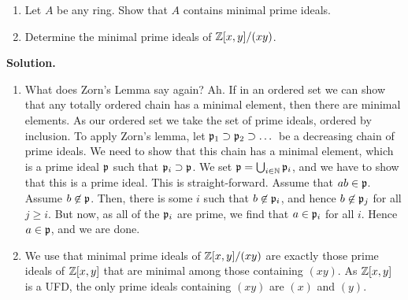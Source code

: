 \documentclass[a4paper,11pt]{article}
\begin{document}
\begin{enumerate}
    \item Let $A$ be any ring. Show that $A$ contains minimal prime ideals. 
    \item Determine the minimal prime ideals of $\mathbb{Z}[x,y]/(xy)$. 
\end{enumerate}

\textbf{Solution.}
\begin{enumerate}
    \item What does Zorn's Lemma say again? Ah. If in an ordered set we can
        show that any totally ordered chain has a minimal element, then there
        are minimal elements. As our ordered set we take the set of prime ideals,
        ordered by inclusion. To apply Zorn's lemma, let $\mathfrak{p}_1 \supset \mathfrak{p}_2
        \supset \dots$ be a decreasing chain of prime ideals. We need to show
        that this chain has a minimal element, which is a prime ideal 
        $\mathfrak{p}$ such that $\mathfrak{p}_i \supset \mathfrak{p}$. We set $\mathfrak{p} = \bigcup_{i \in \mathbb{N}}
        \mathfrak{p}_i$, and we have to show that this is a prime ideal. This is
        straight-forward. Assume that $ab \in \mathfrak{p}$. Assume $b \not \in \mathfrak{p}$.
        Then, there is some $i$ such that $b \not \in \mathfrak{p}_i$, and hence $b \not
        \in \mathfrak{p}_j$ for all $j \geq i$. But now, as all of the $\mathfrak{p}_i$ are
        prime, we find that $a \in \mathfrak{p}_i$ for all $i$. Hence $a \in \mathfrak{p}$, and
        we are done. 
    \item We use that minimal prime ideals of $\mathbb{Z}[x,y]/(xy)$ are exactly those
        prime ideals of $\mathbb{Z}[x,y]$ that are minimal among those containing
        $(xy)$. As $\mathbb{Z}[x,y]$ is a UFD, the only prime ideals containing 
        $(xy)$ are $(x)$ and $(y)$.
\end{enumerate}

\contactend
\end{document}
